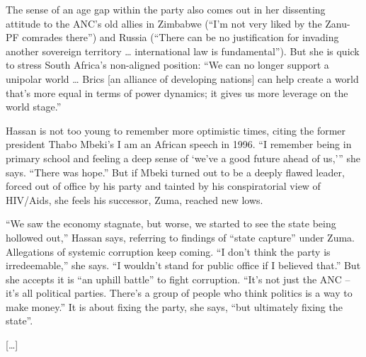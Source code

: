 \documentclass[10pt,a4paper]{article}
\begin{document}
\begin{linenumbers}
The sense of an age gap within the party also comes out in her dissenting attitude to the ANC’s old allies in Zimbabwe (“I’m not very liked by the Zanu-PF comrades there”) and Russia (“There can be no justification for invading another sovereign territory … international law is fundamental”). But she is quick to stress South Africa’s non-aligned position: “We can no longer support a unipolar world … Brics [an alliance of developing nations] can help create a world that’s more equal in terms of power dynamics; it gives us more leverage on the world stage.”

Hassan is not too young to remember more optimistic times, citing the former president Thabo Mbeki’s I am an African speech in 1996. “I remember being in primary school and feeling a deep sense of ‘we’ve a good future ahead of us,’” she says. “There was hope.” But if Mbeki turned out to be a deeply flawed leader, forced out of office by his party and tainted by his conspiratorial view of HIV/Aids, she feels his successor, Zuma, reached new lows.

“We saw the economy stagnate, but worse, we started to see the state being hollowed out,” Hassan says, referring to findings of “state capture” under Zuma. Allegations of systemic corruption keep coming. “I don’t think the party is irredeemable,” she says. “I wouldn’t stand for public office if I believed that.” But she accepts it is “an uphill battle” to fight corruption. “It’s not just the ANC – it’s all political parties. There’s a group of people who think politics is a way to make money.” It is about fixing the party, she says, “but ultimately fixing the state”.


[\ldots]
\end{linenumbers}
\end{document}
